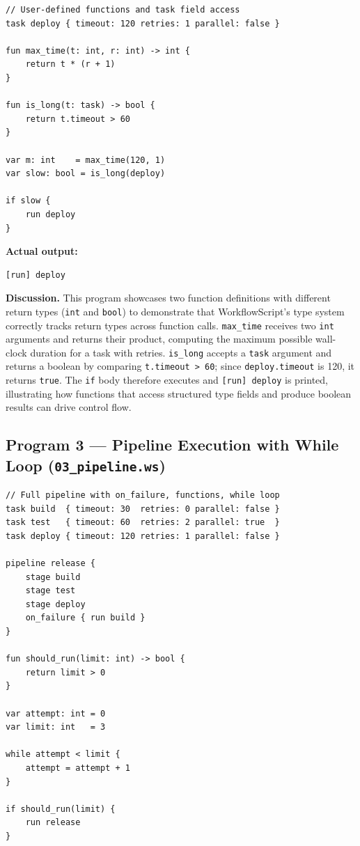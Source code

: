 \documentclass[10pt,a4paper]{article}
\begin{document}
\begin{lstlisting}[caption={02\_functions.ws --- function definitions and task field access}]
// User-defined functions and task field access
task deploy { timeout: 120 retries: 1 parallel: false }

fun max_time(t: int, r: int) -> int {
    return t * (r + 1)
}

fun is_long(t: task) -> bool {
    return t.timeout > 60
}

var m: int    = max_time(120, 1)
var slow: bool = is_long(deploy)

if slow {
    run deploy
}
\end{lstlisting}

\noindent\textbf{Actual output:}
\begin{lstlisting}[style=output]
[run] deploy
\end{lstlisting}

\noindent\textbf{Discussion.}
This program showcases two function definitions with different return types
(\texttt{int} and \texttt{bool}) to demonstrate that WorkflowScript's type system
correctly tracks return types across function calls.
\texttt{max\_time} receives two \texttt{int} arguments and returns their product,
computing the maximum possible wall-clock duration for a task with retries.
\texttt{is\_long} accepts a \texttt{task} argument and returns a boolean by comparing
\texttt{t.timeout > 60}; since \texttt{deploy.timeout} is 120, it returns \texttt{true}.
The \texttt{if} body therefore executes and \texttt{[run] deploy} is printed, illustrating
how functions that access structured type fields and produce boolean results can drive
control flow.

\subsection{Program 3 --- Pipeline Execution with While Loop (\texttt{03\_pipeline.ws})}

\begin{lstlisting}[caption={03\_pipeline.ws --- pipeline with on\_failure, while loop, and conditional run}]
// Full pipeline with on_failure, functions, while loop
task build  { timeout: 30  retries: 0 parallel: false }
task test   { timeout: 60  retries: 2 parallel: true  }
task deploy { timeout: 120 retries: 1 parallel: false }

pipeline release {
    stage build
    stage test
    stage deploy
    on_failure { run build }
}

fun should_run(limit: int) -> bool {
    return limit > 0
}

var attempt: int = 0
var limit: int   = 3

while attempt < limit {
    attempt = attempt + 1
}

if should_run(limit) {
    run release
}
\end{lstlisting}
\end{document}
